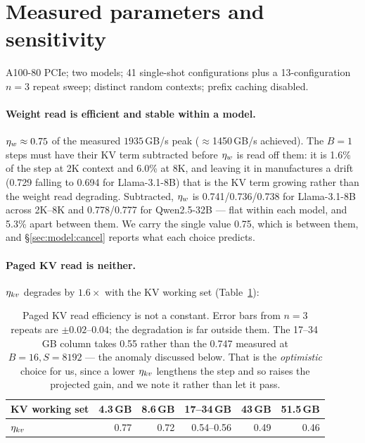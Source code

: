 
\section{Measured parameters and sensitivity}
\label{app:params}

A100-80 PCIe; two models; 41 single-shot configurations plus a
13-configuration $n{=}3$ repeat sweep; distinct random contexts; prefix caching
disabled.

\paragraph{Weight read is efficient and stable within a model.} $\eta_w \approx
0.75$ of the measured $1935$\,GB/s peak ($\approx$1450\,GB/s achieved). The
$B{=}1$ steps must have their KV term subtracted before $\eta_w$ is read off
them: it is 1.6\% of the step at 2K context and 6.0\% at 8K, and leaving it in
manufactures a drift (0.729 falling to 0.694 for Llama-3.1-8B) that is the KV
term growing rather than the weight read degrading. Subtracted, $\eta_w$ is
0.741/0.736/0.738 for Llama-3.1-8B across 2K--8K and 0.778/0.777 for
Qwen2.5-32B --- flat within each model, and 5.3\% apart between them. We carry
the single value 0.75, which is between them, and \S\ref{sec:model:cancel}
reports what each choice predicts.

\paragraph{Paged KV read is neither.} $\eta_{kv}$ degrades by $1.6\times$ with the
KV working set (Table~\ref{tab:effkv}):

\begin{table}[t]
\centering
\small
\begin{tabular}{lrrrrr}
\toprule
KV working set & 4.3\,GB & 8.6\,GB & 17--34\,GB & 43\,GB & 51.5\,GB \\
\midrule
$\eta_{kv}$ & 0.77 & 0.72 & 0.54--0.56 & 0.49 & 0.46 \\
\bottomrule
\end{tabular}
\caption{Paged KV read efficiency is not a constant. Error bars from $n{=}3$
repeats are $\pm0.02$--$0.04$; the degradation is far outside them. The
17--34\,GB column takes 0.55 rather than the 0.747 measured at
$B{=}16,S{=}8192$ --- the anomaly discussed below. That is the
\emph{optimistic} choice for us, since a lower $\eta_{kv}$ lengthens the step and
so raises the projected gain, and we note it rather than let it pass.}
\label{tab:effkv}
\end{table}

